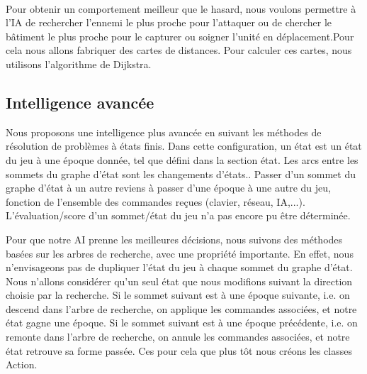 \documentclass[12pt]{report}
\begin{document}
\begin{itemize}
\paragraph{}Pour obtenir un comportement meilleur que le hasard, nous voulons permettre à l'IA de rechercher l'ennemi le plus proche pour l'attaquer ou de chercher le bâtiment le plus proche pour le capturer ou soigner l'unité en déplacement.Pour cela nous allons fabriquer des cartes de distances.
Pour calculer ces cartes, nous utilisons l’algorithme de Dijkstra.
\subsection{Intelligence avancée}
\paragraphe{}Nous proposons une intelligence plus avancée en suivant les méthodes de résolution de problèmes à états ﬁnis. Dans cette conﬁguration, un état est un état du jeu à une époque donnée, tel que déﬁni dans la section état. Les arcs entre les sommets du graphe d’état sont les changements d’états.. Passer d’un sommet du graphe d’état à un autre reviens à passer d’une époque à une autre du jeu, fonction de l’ensemble des commandes reçues (clavier, réseau, IA,...). L’évaluation/score d’un sommet/état du jeu n'a pas encore pu être déterminée.

\paragraphe{}Pour que notre AI prenne les meilleures décisions, nous suivons des méthodes basées sur les arbres de recherche, avec une propriété importante. En effet, nous n’envisageons pas de dupliquer l’état du jeu à chaque sommet du graphe d’état. Nous n’allons considérer qu’un seul état que nous modiﬁons suivant la direction choisie par la recherche. Si le sommet suivant est à une époque suivante, i.e. on descend dans l’arbre de recherche, on applique les commandes associées, et notre état gagne une époque. Si le sommet suivant est à une époque précédente, i.e. on remonte dans l’arbre de recherche, on annule les commandes associées, et notre état retrouve sa forme passée. Ces pour cela que plus tôt nous créons les classes Action.

    \newpage

\end{itemize}
\end{document}
